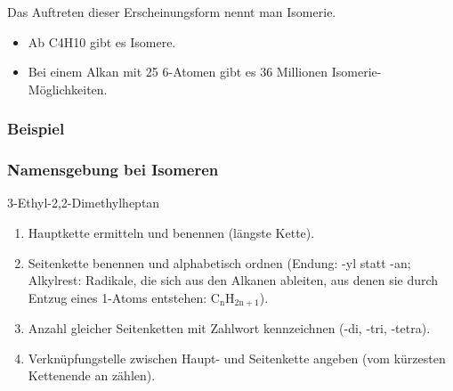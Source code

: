 Das Auftreten dieser Erscheinungsform nennt man Isomerie.

\begin{itemize}
	\item Ab \ac{C4H10} gibt es Isomere.
	\item Bei einem Alkan mit 25 \ac{6}-Atomen gibt es 36 Millionen Isomerie-Möglichkeiten.
\end{itemize}

\subsubsection{Beispiel}
\begin{multicols}{2}

\end{multicols}

\subsubsection{Namensgebung bei Isomeren}
\begin{multicols}{2}

3-Ethyl-2,2-Dimethylheptan
\end{multicols}

\begin{enumerate}
	\item Hauptkette ermitteln und benennen (längste Kette).
	\item Seitenkette benennen und alphabetisch ordnen
		(Endung: -yl statt -an; Alkylrest: Radikale, die sich aus den Alkanen ableiten,
		aus denen sie durch Entzug eines \ac{1}-Atoms entstehen: $\mathrm{C_nH_{2n+1}}$).
	\item Anzahl gleicher Seitenketten mit Zahlwort kennzeichnen (-di, -tri, -tetra).
	\item Verknüpfungstelle zwischen Haupt- und Seitenkette angeben (vom kürzesten
		Kettenende an zählen).
\end{enumerate}

